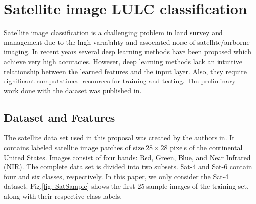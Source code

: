 \section{Satellite image LULC classification}

Satellite image classification is a challenging problem in land survey and management due to the high variability and associated noise of satellite/airborne imaging. In recent years several deep learning methods have been proposed which achieve very high accuracies. However, deep learning methods lack an intuitive relationship between the learned features and the input layer. Also, they require significant computational resources for training and testing. The preliminary work done with the dataset was published in\cite{Liyanage2020}.

\subsection{Dataset and Features}

The satellite data set used in this proposal was created by the authors in\cite{Basu2015}. It contains labeled satellite image patches of size $28\times28$ pixels of the continental United States. Images consist of four bands: Red, Green, Blue, and Near Infrared (NIR). The complete data set is divided into two subsets. Sat-4 and Sat-6 contain four and six classes, respectively. In this paper, we only consider the Sat-4 dataset. Fig.\ref{fig: SatSample} shows the first $25$ sample images of the training set, along with their respective class labels.


